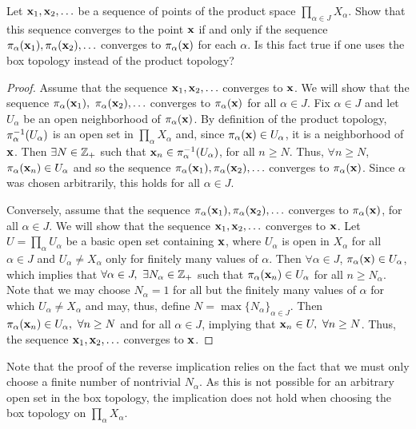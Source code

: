 \begin{exercise}[ID=2.19.6]
    Let $\mathbf{x}_1, \mathbf{x}_2, \ldots$ be a sequence of points of the product space $\prod_{\alpha \in J} X_\alpha$.
    Show that this sequence converges to the point $\mathbf{x}$ if and only if the sequence $\pi_\alpha(\mathbf{x}_1), \pi_\alpha(\mathbf{x}_2), \ldots$ converges to $\pi_\alpha(\mathbf{x})$ for each $\alpha$.
    Is this fact true if one uses the box topology instead of the product topology?
\end{exercise}

\begin{solution}
    \begin{proof}
        Assume that the sequence $\mathbf{x}_1, \mathbf{x}_2, \ldots$ converges to $\mathbf{x}$.
        We will show that the sequence $\pi_\alpha(\mathbf{x}_1),$\newline
        $\pi_\alpha(\mathbf{x}_2), \ldots$ converges to $\pi_\alpha(\mathbf{x})$ for all $\alpha \in J$.
        Fix $\alpha \in J$ and let $U_\alpha$ be an open neighborhood of $\pi_\alpha(\mathbf{x})$.
        By definition of the product topology, $\pi_\alpha^{-1}(U_\alpha)$ is an open set in $\prod_\alpha X_\alpha$ and, since $\pi_\alpha(\mathbf{x}) \in U_\alpha$, it is a neighborhood of $\mathbf{x}$.
        Then $\exists N \in \mathbb{Z}_+$ such that $\mathbf{x}_n \in \pi_\alpha^{-1}(U_\alpha)$, for all $n \geq N$.
        Thus, $\forall n \geq N$, $\pi_\alpha(\mathbf{x}_n) \in U_\alpha$ and so the sequence $\pi_\alpha(\mathbf{x}_1), \pi_\alpha(\mathbf{x}_2), \ldots$ converges to $\pi_\alpha(\mathbf{x})$.
        Since $\alpha$ was chosen arbitrarily, this holds for all $\alpha \in J$.

        Conversely, assume that the sequence $\pi_\alpha(\mathbf{x}_1), \pi_\alpha(\mathbf{x}_2), \ldots$ converges to $\pi_\alpha(\mathbf{x})$, for all $\alpha \in J$.
        We will show that the sequence $\mathbf{x}_1, \mathbf{x}_2, \ldots$ converges to $\mathbf{x}$.
        Let $U = \prod_\alpha U_\alpha$ be a basic open set containing $\mathbf{x}$, where $U_\alpha$ is open in $X_\alpha$ for all $\alpha \in J$ and $U_\alpha \neq X_\alpha$ only for finitely many values of $\alpha$.
        Then $\forall \alpha \in J$, $\pi_\alpha(\mathbf{x}) \in U_\alpha$, which implies that $\forall \alpha \in J,~ \exists N_\alpha \in \mathbb{Z}_+$ such that $\pi_\alpha(\mathbf{x}_n) \in U_\alpha$ for all $n \geq N_\alpha$.
        Note that we may choose $N_\alpha = 1$ for all but the finitely many values of $\alpha$ for which $U_\alpha \neq X_\alpha$ and may, thus, define $N = \max\{N_\alpha\}_{\alpha \in J}$.
        Then $\pi_\alpha(\mathbf{x}_n) \in U_\alpha,~ \forall n \geq N$ and for all $\alpha \in J$, implying that $\mathbf{x}_n \in U,~ \forall n \geq N$.
        Thus, the sequence $\mathbf{x}_1, \mathbf{x}_2, \ldots$ converges to $\mathbf{x}$.
    \end{proof}

    Note that the proof of the reverse implication relies on the fact that we must only choose a finite number of nontrivial $N_\alpha$.
    As this is not possible for an arbitrary open set in the box topology, the implication does not hold when choosing the box topology on $\prod_\alpha X_\alpha$.
\end{solution}
\newpage

